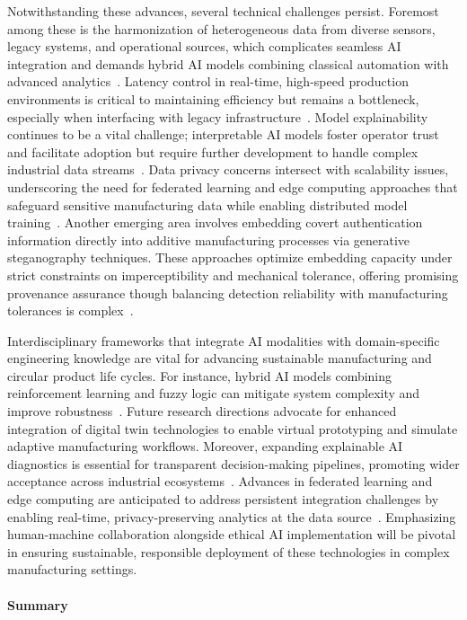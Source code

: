 \documentclass[sigconf]{acmart}
\begin{document}
Notwithstanding these advances, several technical challenges persist. Foremost among these is the harmonization of heterogeneous data from diverse sensors, legacy systems, and operational sources, which complicates seamless AI integration and demands hybrid AI models combining classical automation with advanced analytics~\cite{ref10,ref20,ref36}. Latency control in real-time, high-speed production environments is critical to maintaining efficiency but remains a bottleneck, especially when interfacing with legacy infrastructure~\cite{ref10,ref42}. Model explainability continues to be a vital challenge; interpretable AI models foster operator trust and facilitate adoption but require further development to handle complex industrial data streams~\cite{ref10,ref42}. Data privacy concerns intersect with scalability issues, underscoring the need for federated learning and edge computing approaches that safeguard sensitive manufacturing data while enabling distributed model training~\cite{ref29,ref36}. Another emerging area involves embedding covert authentication information directly into additive manufacturing processes via generative steganography techniques. These approaches optimize embedding capacity under strict constraints on imperceptibility and mechanical tolerance, offering promising provenance assurance though balancing detection reliability with manufacturing tolerances is complex~\cite{ref10}.

Interdisciplinary frameworks that integrate AI modalities with domain-specific engineering knowledge are vital for advancing sustainable manufacturing and circular product life cycles. For instance, hybrid AI models combining reinforcement learning and fuzzy logic can mitigate system complexity and improve robustness~\cite{ref29,ref36,ref44}. Future research directions advocate for enhanced integration of digital twin technologies to enable virtual prototyping and simulate adaptive manufacturing workflows. Moreover, expanding explainable AI diagnostics is essential for transparent decision-making pipelines, promoting wider acceptance across industrial ecosystems~\cite{ref38}. Advances in federated learning and edge computing are anticipated to address persistent integration challenges by enabling real-time, privacy-preserving analytics at the data source~\cite{ref29,ref36}. Emphasizing human-machine collaboration alongside ethical AI implementation will be pivotal in ensuring sustainable, responsible deployment of these technologies in complex manufacturing settings.

\paragraph{Summary}
\end{document}
